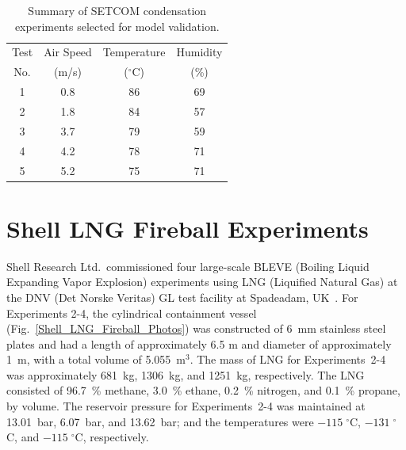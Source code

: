 \begin{table}[h]
	\caption[Summary of SETCOM condensation experiments selected for model validation]{Summary of SETCOM condensation experiments selected for model validation.}
	\begin{center}
		\begin{tabular}{|c|c|c|c|}
			\hline
			Test      &  Air Speed        &  Temperature          &  Humidity             \\
			No.       &  (m/s)            &  ($^{\circ}$C)        &  (\%)                 \\ \hline \hline
			1         &  0.8              &  86                   &  69                   \\ \hline
			2         &  1.8              &  84                   &  57                   \\ \hline
			3         &  3.7              &  79                   &  59                   \\ \hline
			4         &  4.2              &  78                   &  71                   \\ \hline
			5         &  5.2              &  75                   &  71                   \\ \hline
		\end{tabular}
	\end{center}
	\label{SETCOM_condensation_Summary}
\end{table}

\FloatBarrier


\section{Shell LNG Fireball Experiments}
\label{Shell_LNG_Fireballs_Description}

Shell Research Ltd.~commissioned four large-scale BLEVE (Boiling Liquid Expanding Vapor Explosion) experiments using LNG (Liquified Natural Gas) at the DNV (Det Norske Veritas) GL test facility at Spadeadam, UK~\cite{Betteridge:2015}. For Experiments 2-4, the cylindrical containment vessel (Fig.~\ref{Shell_LNG_Fireball_Photos}) was constructed of 6~mm stainless steel plates and had a length of approximately 6.5 m and diameter of approximately 1~m, with a total volume of 5.055~m$^3$. The mass of LNG for Experiments~2-4 was approximately 681~kg, 1306~kg, and 1251~kg, respectively. The LNG consisted of 96.7~\% methane, 3.0~\% ethane, 0.2~\% nitrogen, and 0.1~\% propane, by volume. The reservoir pressure for Experiments~2-4 was maintained at 13.01~bar, 6.07~bar, and 13.62~bar; and the temperatures were $-115 \; ^\circ$C, $-131 \; ^\circ$C, and $-115 \; ^\circ$C, respectively.

